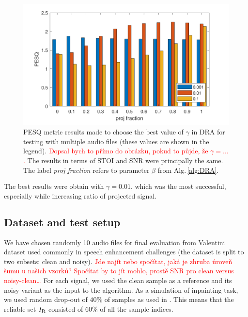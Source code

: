 \documentclass[conference]{IEEEtran}
\newcommand{\todo}[1]{\textcolor{red}{#1}}
\begin{document}
\begin{figure}[h]
	\includegraphics[width=1\linewidth]{figures/gamma_test}
	\caption{PESQ metric results made to choose the best value of $\gamma$ in DRA for testing with multiple audio files (these values are shown in the legend). \todo{Dopsal bych to přímo do obrázku, pokud to půjde, že $\gamma=\dots$.}
	The results in terms of STOI and SNR were principally the same.
	The label \textit{proj fraction} refers to parameter $\beta$ from Alg.\,\ref{alg:DRA}.}
	\label{fig:gammatest}
\end{figure}

The best results were obtain with $\gamma=0.01$, which was the most successful, especially while increasing ratio of projected signal.

\subsection{Dataset and test setup}
We have chosen randomly 10 audio files for final evaluation from Valentini dataset \cite{ValentiniBotinhao2017} used commonly in speech enhancement challenges (the dataset is split to two subsets: clean and noisy).
\todo{Jde najít nebo spočítat, jaká je zhruba úroveň šumu u našich vzorků? Spočítat by to jít mohlo, prostě SNR pro clean versus noisy-clean\dots}
For each signal, we used the clean sample as a reference and its noisy variant as the input to the algorithm. %
As a simulation of inpainting task, we used random drop-out of %
$40\%$ of samples as used in \cite{Mokry2021}.
This means that the reliable set $I_\textup{R}$ consisted of $60\%$ of all the sample indices.
\end{document}
